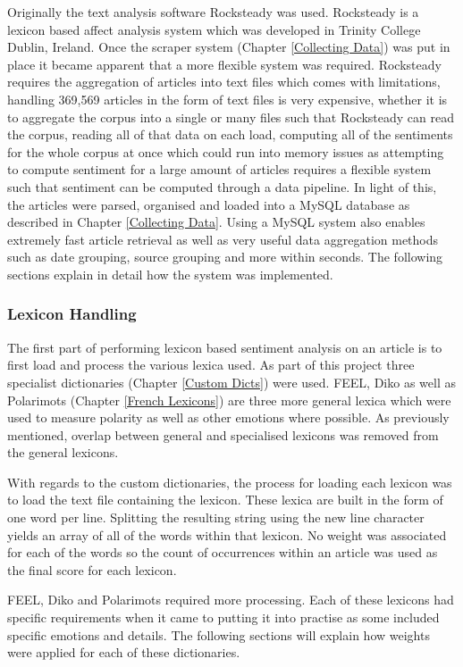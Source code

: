 Originally the text analysis software Rocksteady \citep{ahmad2014rocksteady} was used. Rocksteady is a lexicon based affect analysis system which was developed in Trinity College Dublin, Ireland. Once the scraper system (Chapter \ref{Collecting Data}) was put in place it became apparent that a more flexible system was required. Rocksteady requires the aggregation of articles into text files which comes with limitations, handling 369,569 articles in the form of text files is very expensive, whether it is to aggregate the corpus into a single or many files such that Rocksteady can read the corpus, reading all of that data on each load, computing all of the sentiments for the whole corpus at once which could run into memory issues as attempting to compute sentiment for a large amount of articles requires a flexible system such that sentiment can be computed through a data pipeline. In light of this, the articles were parsed, organised and loaded into a MySQL database as described in Chapter \ref{Collecting Data}. Using a MySQL system also enables extremely fast article retrieval as well as very useful data aggregation methods such as date grouping, source grouping and more within seconds. The following sections explain in detail how the system was implemented.
 
\subsubsection{Lexicon Handling}

The first part of performing lexicon based sentiment analysis on an article is to first load and process the various lexica used. As part of this project three specialist dictionaries (Chapter \ref{Custom Dicts}) were used. FEEL, Diko as well as Polarimots (Chapter \ref{French Lexicons}) are three more general lexica which were used to measure polarity as well as other emotions where possible. As previously mentioned, overlap between general and specialised lexicons was removed from the general lexicons.

With regards to the custom dictionaries, the process for loading each lexicon was to load the text file containing the lexicon. These lexica are built in the form of one word per line. Splitting the resulting string using the new line character yields an array of all of the words within that lexicon. No weight was associated for each of the words so the count of occurrences within an article was used as the final score for each lexicon.

FEEL, Diko and Polarimots required more processing. Each of these lexicons had specific requirements when it came to putting it into practise as some included specific emotions and details. The following sections will explain how weights were applied for each of these dictionaries.

